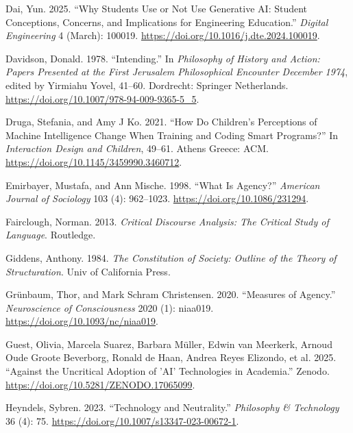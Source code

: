 \documentclass[
  letterpaper,
  DIV=11,
  numbers=noendperiod]{scrartcl}
\newlength{\cslhangindent}
\newenvironment{CSLReferences}[2] %
 {\begin{list}{}{%
  \setlength{\itemindent}{0pt}
  \setlength{\leftmargin}{0pt}
  \setlength{\parsep}{0pt}
  \ifodd #1
   \setlength{\leftmargin}{\cslhangindent}
   \setlength{\itemindent}{-1\cslhangindent}
  \fi
  \setlength{\itemsep}{#2\baselineskip}}}
 {\end{list}}
\begin{document}
\begin{CSLReferences}{1}{0}
Dai, Yun. 2025. {``Why Students Use or Not Use Generative {AI}:
{Student} Conceptions, Concerns, and Implications for Engineering
Education.''} \emph{Digital Engineering} 4 (March): 100019.
\url{https://doi.org/10.1016/j.dte.2024.100019}.

Davidson, Donald. 1978. {``Intending.''} In \emph{Philosophy of
{History} and {Action}: {Papers Presented} at the {First Jerusalem
Philosophical Encounter December} 1974}, edited by Yirmiahu Yovel,
41--60. Dordrecht: Springer Netherlands.
\url{https://doi.org/10.1007/978-94-009-9365-5_5}.

Druga, Stefania, and Amy J Ko. 2021. {``How Do Children's Perceptions of
Machine Intelligence Change When Training and Coding Smart Programs?''}
In \emph{Interaction {Design} and {Children}}, 49--61. Athens Greece:
ACM. \url{https://doi.org/10.1145/3459990.3460712}.

Emirbayer, Mustafa, and Ann Mische. 1998. {``What {Is Agency}?''}
\emph{American Journal of Sociology} 103 (4): 962--1023.
\url{https://doi.org/10.1086/231294}.

Fairclough, Norman. 2013. \emph{Critical Discourse Analysis: {The}
Critical Study of Language}. Routledge.

Giddens, Anthony. 1984. \emph{The Constitution of Society: {Outline} of
the Theory of Structuration}. Univ of California Press.

Grünbaum, Thor, and Mark Schram Christensen. 2020. {``Measures of
Agency.''} \emph{Neuroscience of Consciousness} 2020 (1): niaa019.
\url{https://doi.org/10.1093/nc/niaa019}.

Guest, Olivia, Marcela Suarez, Barbara Müller, Edwin van Meerkerk,
Arnoud Oude Groote Beverborg, Ronald de Haan, Andrea Reyes Elizondo, et
al. 2025. {``Against the {Uncritical Adoption} of '{AI}' {Technologies}
in {Academia}.''} Zenodo. \url{https://doi.org/10.5281/ZENODO.17065099}.

Heyndels, Sybren. 2023. {``Technology and {Neutrality}.''}
\emph{Philosophy \& Technology} 36 (4): 75.
\url{https://doi.org/10.1007/s13347-023-00672-1}.


\end{CSLReferences}
\end{document}
